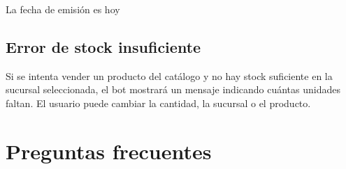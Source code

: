 \documentclass[12pt,a4paper]{article}
\begin{document}
\begin{mensajeusuario}
La fecha de emisi\'on es hoy
\end{mensajeusuario}

\subsection{Error de stock insuficiente}

Si se intenta vender un producto del cat\'alogo y no hay stock suficiente en la sucursal seleccionada, el bot mostrar\'a un mensaje indicando cu\'antas unidades faltan. El usuario puede cambiar la cantidad, la sucursal o el producto.

\section{Preguntas frecuentes}
\end{document}
